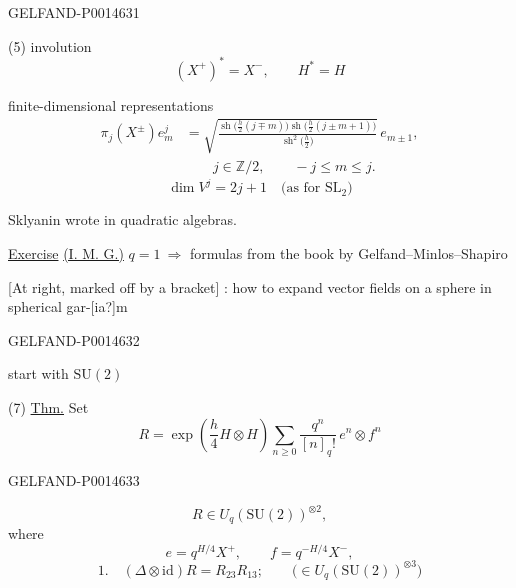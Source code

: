 \begin{GelfandAdjacentEvidence}{GELFAND-P001463}{1}

(5) involution
\[
(X^+)^*=X^-,\qquad H^*=H
\]

finite-dimensional representations
\begin{equation*}
\begin{aligned}
\pi_j(X^\pm)e_m^j
&=\sqrt{\frac{\operatorname{sh}\bigl(\frac h2(j\mp m)\bigr)
\operatorname{sh}\bigl(\frac h2(j\pm m+1)\bigr)}
{\operatorname{sh}^2\bigl(\frac h2\bigr)}}\,e_{m\pm1},\\
&\hspace{2em}j\in\mathbb Z/2,\qquad -j\le m\le j.
\end{aligned}\tag{6}
\end{equation*}
\[
\dim V^j=2j+1\quad\text{(as for \(\mathrm{SL}_2\))}
\]

Sklyanin wrote in quadratic algebras.

\underline{Exercise} \underline{(I. M. G.)} \(q=1\ \Rightarrow\) formulas from the book by Gelfand–Minlos–Shapiro

[At right, marked off by a bracket] : how to expand vector fields on a sphere in spherical gar-[ia?]m
\end{GelfandAdjacentEvidence}
\begin{GelfandAdjacentEvidence}{GELFAND-P001463}{2}


start with \(\mathrm{SU}(2)\)

(7) \underline{Thm.} Set
\begin{equation*}
R=\exp\left(\frac h4 H\otimes H\right)
  \sum_{n\ge0}\frac{q^n}{[n]_q!}\,e^n\otimes f^n
\tag{8}
\end{equation*}
\end{GelfandAdjacentEvidence}
\begin{GelfandAdjacentEvidence}{GELFAND-P001463}{3}


\[
R\in U_q(\mathrm{SU}(2))^{\otimes2},
\]
where
\begin{equation*}
e=q^{H/4}X^+,\qquad f=q^{-H/4}X^-,
\tag{9}
\end{equation*}
\begin{equation*}
1.\quad(\Delta\otimes\mathrm{id})R=R_{23}R_{13};\qquad
  \bigl(\in U_q(\mathrm{SU}(2))^{\otimes3}\bigr)
\tag{10}
\end{equation*}
\end{GelfandAdjacentEvidence}

